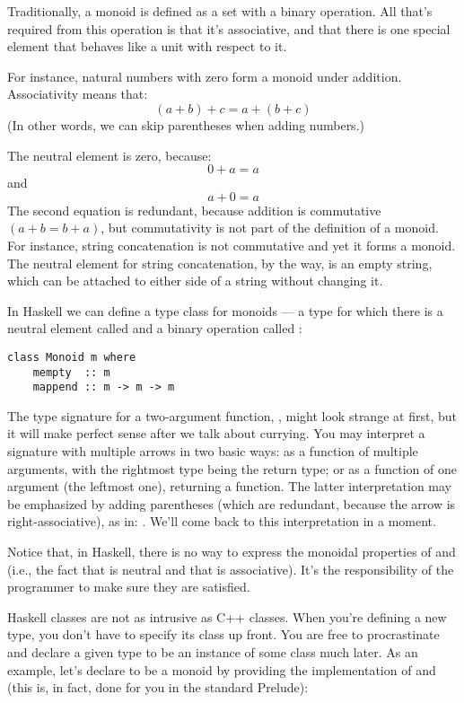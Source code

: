 Traditionally, a monoid is defined as a set with a binary operation. All
that's required from this operation is that it's associative, and that
there is one special element that behaves like a unit with respect to
it.

For instance, natural numbers with zero form a monoid under addition.
Associativity means that:
\[(a + b) + c = a + (b + c)\]
(In other words, we can skip parentheses when adding numbers.)

The neutral element is zero, because:
\[0 + a = a\]
and
\[a + 0 = a\]
The second equation is redundant, because addition is commutative $(a + b
= b + a)$, but commutativity is not part of the definition of a monoid.
For instance, string concatenation is not commutative and yet it forms a
monoid. The neutral element for string concatenation, by the way, is an
empty string, which can be attached to either side of a string without
changing it.

In Haskell we can define a type class for monoids --- a type for which
there is a neutral element called  and a binary operation
called :

\begin{Verbatim}
class Monoid m where
    mempty  :: m
    mappend :: m -> m -> m
\end{Verbatim}
The type signature for a two-argument function,
, might look strange at first,
but it will make perfect sense after we talk about currying. You may
interpret a signature with multiple arrows in two basic ways: as a
function of multiple arguments, with the rightmost type being the return
type; or as a function of one argument (the leftmost one), returning a
function. The latter interpretation may be emphasized by adding
parentheses (which are redundant, because the arrow is
right-associative), as in: .
We'll come back to this interpretation in a moment.

Notice that, in Haskell, there is no way to express the monoidal
properties of  and  (i.e., the fact that
 is neutral and that  is associative).
It's the responsibility of the programmer to make sure they are
satisfied.

Haskell classes are not as intrusive as C++ classes. When you're
defining a new type, you don't have to specify its class up front. You
are free to procrastinate and declare a given type to be an instance of
some class much later. As an example, let's declare  to
be a monoid by providing the implementation of  and
 (this is, in fact, done for you in the standard
Prelude):

